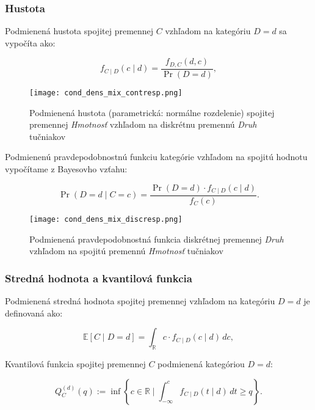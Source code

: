 \subsubsection{Hustota}

Podmienená hustota spojitej premennej $C$ vzhľadom na kategóriu $D=d$ sa vypočíta ako:

\begin{equation}
f_{C \mid D}(c \mid d) = \frac{f_{D,C}(d, c)}{\Pr(D = d)},
\end{equation}

\begin{figure}[H]
    \centering
    \texttt{[image: cond\_dens\_mix\_contresp.png]}
    \caption{Podmienená hustota (parametrická: normálne rozdelenie) spojitej premennej \textit{Hmotnosť} vzhľadom na diskrétnu premennú \textit{Druh} tučniakov}
    \label{fig:cond_dens_mix_contresp}
\end{figure}

Podmienenú pravdepodobnostnú funkciu kategórie vzhľadom na spojitú hodnotu vypočítame z Bayesovho vzťahu:

\begin{equation}
\Pr(D = d \mid C = c) = \frac{\Pr(D = d) \cdot f_{C \mid D}(c \mid d)}{f_C(c)}.
\end{equation}

\begin{figure}[H]
    \centering
    \texttt{[image: cond\_dens\_mix\_discresp.png]}
    \caption{Podmienená pravdepodobnostná funkcia diskrétnej premennej \textit{Druh} vzhľadom na spojitú premennú \textit{Hmotnosť} tučniakov}
    \label{fig:cond_dens_mix_contresp}
\end{figure}

\subsubsection{Stredná hodnota a kvantilová funkcia}

Podmienená stredná hodnota spojitej premennej vzhľadom na kategóriu $D = d$ je definovaná ako:

\begin{equation}
\mathbb{E}[C \mid D = d] = \int_{\mathbb{R}} c \cdot f_{C \mid D}(c \mid d) \, dc,
\end{equation}

Kvantilová funkcia spojitej premennej $C$ podmienená kategóriou $D = d$:

\begin{equation}
Q_C^{(d)}(q) := \inf \left\{ c \in \mathbb{R} \mid \int_{-\infty}^c f_{C \mid D}(t \mid d) \, dt \geq q \right\}.
\end{equation}

